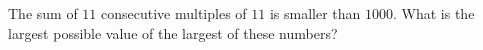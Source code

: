 The sum of $11$ consecutive multiples of $11$ is smaller than $1000$. What is the largest possible value of the largest of these numbers?
